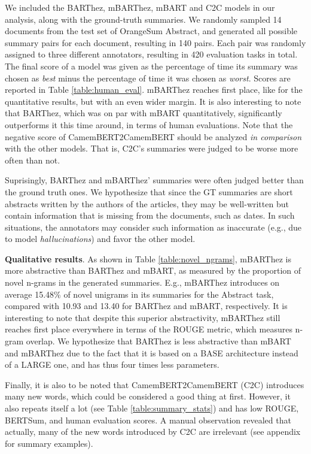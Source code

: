 \documentclass[11pt,a4paper]{article}
\begin{document}
We included the BARThez, mBARThez, mBART and C2C models in our analysis, along with the ground-truth summaries.
We randomly sampled 14 documents from the test set of OrangeSum Abstract, and generated all possible summary pairs for each document, resulting in 140 pairs.
Each pair was randomly assigned to three different annotators, resulting in 420 evaluation tasks in total.
The final score of a model was given as the percentage of time its summary was chosen as \textit{best} minus the percentage of time it was chosen as \textit{worst}.
Scores are reported in Table \ref{table:human_eval}. 
mBARThez reaches first place, like for the quantitative results, but with an even wider margin.
It is also interesting to note that BARThez, which was on par with mBART quantitatively, significantly outperforms it this time around, in terms of human evaluations.
Note that the negative score of CamemBERT2CamemBERT should be analyzed \textit{in comparison} with the other models.
That is, C2C's summaries were judged to be worse more often than not.

Suprisingly, BARThez and mBARThez' summaries were often judged better than the ground truth ones.
We hypothesize that since the GT summaries are short abstracts written by the authors of the articles, they may be well-written but contain information that is missing from the documents, such as dates.
In such situations, the annotators may consider such information as inaccurate (e.g., due to model \textit{hallucinations}) and favor the other model.

\noindent \textbf{Qualitative results}.
As shown in Table \ref{table:novel_ngrams}, mBARThez is more abstractive than BARThez and mBART, as measured by the proportion of novel n-grams in the generated summaries.
E.g., mBARThez introduces on average 15.48\% of novel unigrams in its summaries for the Abstract task, compared with 10.93 and 13.40 for BARThez and mBART, respectively.
It is interesting to note that despite this superior abstractivity, mBARThez still reaches first place everywhere in terms of the ROUGE metric, which measures n-gram overlap.
We hypothesize that BARThez is less abstractive than mBART and mBARThez due to the fact that it is based on a BASE architecture instead of a LARGE one, and has thus four times less parameters.

Finally, it is also to be noted that CamemBERT2CamemBERT (C2C) introduces many new words, which could be considered a good thing at first.
However, it also repeats itself a lot (see Table \ref{table:summary_stats}) and has low ROUGE, BERTSum, and human evaluation scores.
A manual observation revealed that actually, many of the new words introduced by C2C are irrelevant (see appendix for summary examples).
\end{document}
